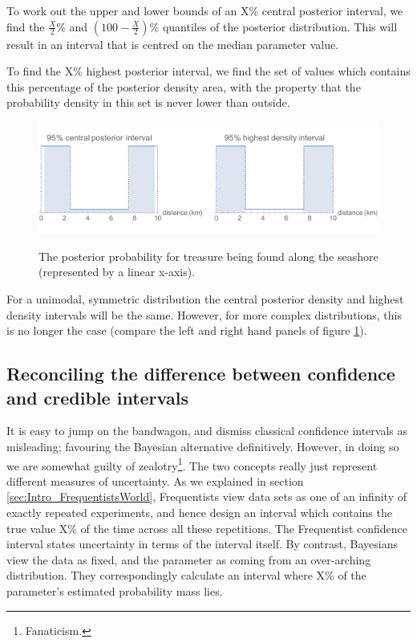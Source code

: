 \documentclass[11pt,fullpage]{book}
\begin{document}
To work out the upper and lower bounds of an X\% central posterior interval, we find the $\frac{X}{2}\%$ and $(100-\frac{X}{2})\%$ quantiles of the posterior distribution. This will result in an interval that is centred on the median parameter value.

To find the X\% highest posterior interval, we find the set of values which contains this percentage of the posterior density area, with the property that the probability density in this set is never lower than outside.

\begin{figure}
\centering
\scalebox{0.35} 
{\includegraphics{Posterior_CPIvsHDI.pdf}}
\caption{The posterior probability for treasure being found along the seashore (represented by a linear x-axis).}\label{fig:Posterior_CPIvsHDI}
\end{figure}

For a unimodal, symmetric distribution the central posterior density and highest density intervals will be the same. However, for more complex distributions, this is no longer the case (compare the left and right hand panels of figure \ref{fig:Posterior_CPIvsHDI}).


\subsection{Reconciling the difference between confidence and credible intervals}
It is easy to jump on the bandwagon, and dismiss classical confidence intervals as misleading; favouring the Bayesian alternative definitively. However, in doing so we are somewhat guilty of zealotry\footnote{Fanaticism.}. The two concepts really just represent different measures of uncertainty. As we explained in section \ref{sec:Intro_FrequentistsWorld}, Frequentists view data sets as one of an infinity of exactly repeated experiments, and hence design an interval which contains the true value X\% of the time across all these repetitions. The Frequentist confidence interval states uncertainty in terms of the interval itself. By contrast, Bayesians view the data as fixed, and the parameter as coming from an over-arching distribution. They correspondingly calculate an interval where X\% of the parameter's estimated probability mass lies.
\end{document}
